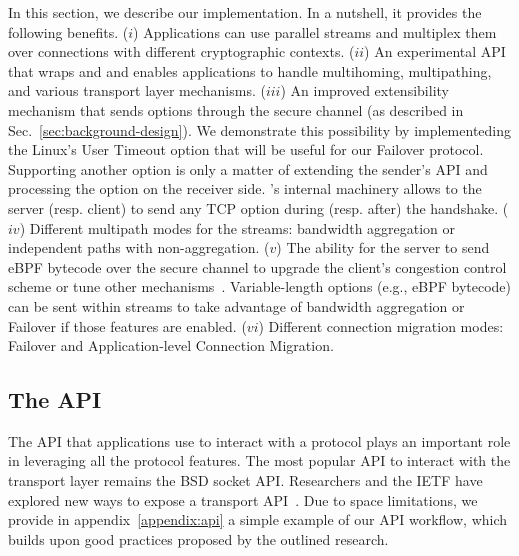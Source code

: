 \label{sec:content}

In this section, we describe our \tcpls implementation. In a nutshell, it provides the following benefits.
($i$) Applications can use parallel streams and multiplex them over \tcp connections with different cryptographic contexts.
($ii$) An experimental API that wraps \tls and \tcp and enables applications to
    handle multihoming, multipathing, and various transport layer mechanisms.
($iii$) An improved \tcp extensibility mechanism that sends \tcp options
   through the secure \tcpls channel (as described in
   Sec.~\ref{sec:background-design}). We demonstrate this possibility by
   implementeding the Linux's \tcp User Timeout option that will be useful for
   our Failover protocol. Supporting another \tcp option is only a matter of
   extending the sender's API and processing the option on the receiver side.
   \tcpls's internal machinery allows to the server (resp. client) to send any
   TCP option during (resp. after) the \tls handshake.
($iv$) Different multipath modes for the \tcpls streams: bandwidth aggregation
or independent paths with non-aggregation.
($v$) The ability for the server to send eBPF bytecode over the secure channel to upgrade the client's \tcp congestion control scheme or tune other \tcp mechanisms~\cite{brakmo2017tcp,tran2019beyond}. Variable-length options (e.g., eBPF bytecode) can be sent within streams to take advantage of bandwidth aggregation or Failover if those features are enabled.
($vi$) Different connection migration modes: Failover and Application-level
Connection Migration.



\subsection{The \tcpls API}

The API that applications use to interact with a protocol plays an important
role in leveraging all the protocol features. The most popular
API to interact with the transport layer remains the BSD socket API. Researchers
and the IETF have explored new ways to expose a transport
API~\cite{draft-ietf-taps-arch,hruby2014sockets,rfc6458,schmidt2013socket}.
Due to space limitations, we provide in appendix~\ref{appendix:api} a simple example of our API workflow,
which builds upon good practices proposed by the outlined research.

